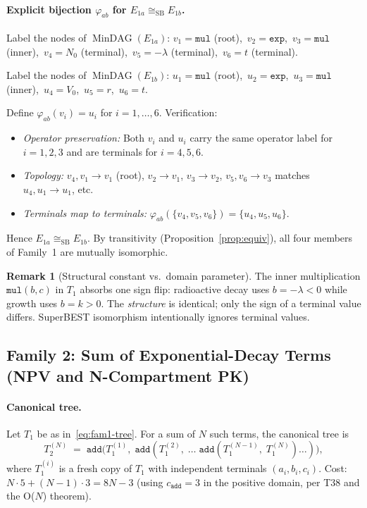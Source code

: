 \documentclass[12pt,a4paper]{article}
\theoremstyle{definition}
\newtheorem{remark}[theorem]{Remark}
\newcommand{\MinDAG}{\operatorname{MinDAG}}
\newcommand{\mexp}{\mathtt{exp}}
\newcommand{\mmul}{\mathtt{mul}}
\newcommand{\madd}{\mathtt{add}}
\newcommand{\siso}{\cong_{\mathrm{SB}}}
\begin{document}
\paragraph{Explicit bijection $\varphi_{ab}$ for $E_{1a} \siso E_{1b}$.}

Label the nodes of $\MinDAG(E_{1a})$:
$v_1 = \mmul$ (root),\ $v_2 = \mexp$,\ $v_3 = \mmul$ (inner),\ $v_4 = N_0$
(terminal),\ $v_5 = -\lambda$ (terminal),\ $v_6 = t$ (terminal).

Label the nodes of $\MinDAG(E_{1b})$:
$u_1 = \mmul$ (root),\ $u_2 = \mexp$,\ $u_3 = \mmul$ (inner),\ $u_4 = V_0$,\
$u_5 = r$,\ $u_6 = t$.

Define $\varphi_{ab}(v_i) = u_i$ for $i = 1,\ldots,6$.  Verification:
\begin{itemize}
  \item \textit{Operator preservation:} Both $v_i$ and $u_i$ carry the same
        operator label for $i = 1,2,3$ and are terminals for $i = 4,5,6$.
  \item \textit{Topology:} $v_4, v_1 \to v_1$ (root), $v_2 \to v_1$,
        $v_3 \to v_2$, $v_5, v_6 \to v_3$ matches $u_4, u_1 \to u_1$, etc.
  \item \textit{Terminals map to terminals:} $\varphi_{ab}(\{v_4,v_5,v_6\})
        = \{u_4,u_5,u_6\}$.
\end{itemize}
Hence $E_{1a} \siso E_{1b}$.  By transitivity (Proposition~\ref{prop:equiv}),
all four members of Family~1 are mutually isomorphic.

\begin{remark}[Structural constant vs.\ domain parameter]
The inner multiplication $\mmul(b, c)$ in $T_1$ absorbs one sign flip:
radioactive decay uses $b = -\lambda < 0$ while growth uses $b = k > 0$.  The
\emph{structure} is identical; only the sign of a terminal value differs.
SuperBEST isomorphism intentionally ignores terminal values.
\end{remark}

\subsection{Family 2: Sum of Exponential-Decay Terms (NPV and N-Compartment PK)}
\label{sec:fam2}

\paragraph{Canonical tree.}
Let $T_1$ be as in~\eqref{eq:fam1-tree}.  For a sum of $N$ such terms, the
canonical tree is
\[
  T_2^{(N)} \;=\; \madd\bigl(T_1^{(1)},\; \madd(T_1^{(2)},\;\ldots\;
                  \madd(T_1^{(N-1)},\; T_1^{(N)})\ldots)\bigr),
\]
where $T_1^{(i)}$ is a fresh copy of $T_1$ with independent terminals
$(a_i, b_i, c_i)$.  Cost: $N \cdot 5 + (N-1) \cdot 3 = 8N - 3$
(using $c_{\madd} = 3$ in the positive domain, per T38 and the O($N$) theorem).
\end{document}
